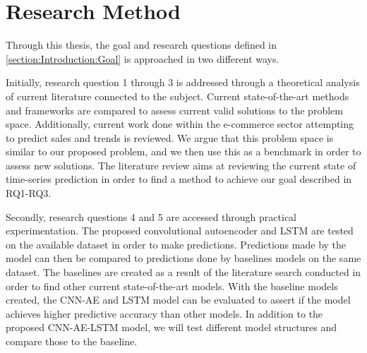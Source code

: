 \section{Research Method}
\label{section:Introduction:research-method}

Through this thesis, the goal and research questions defined in \autoref{section:Introduction:Goal} is approached in two different ways.

Initially, research question 1 through 3 is addressed through a theoretical analysis of current literature connected to the subject.
Current state-of-the-art methods and frameworks are compared to assess current valid solutions to the problem space.
Additionally, current work done within the e-commerce sector attempting to predict sales and trends is reviewed.
We argue that this problem space is similar to our proposed problem, and we then use this as a benchmark in order to assess new solutions.
The literature review aims at reviewing the current state of time-series prediction in order to find a method to achieve our goal described in RQ1-RQ3.

Secondly, research questions 4 and 5 are accessed through practical experimentation.
The proposed convolutional autoencoder and LSTM are tested on the available dataset in order to make predictions.
Predictions made by the model can then be compared to predictions done by baselines models on the same dataset.
The baselines are created as a result of the literature search conducted in order to find other current state-of-the-art models.
With the baseline models created, the CNN-AE and LSTM model can be evaluated to assert if the model achieves higher predictive accuracy than other models.
In addition to the proposed CNN-AE-LSTM model, we will test different model structures and compare those to the baseline.



\iffalse
  This thesis approaches the goal and research questions through theoretical analysis
  of the problem space.
  Primarily the focus of this thesis is to conduct a review and analysis of current literature.
  Reviewing the current state-of-the-art methods for predictive analysis of time-series,
  as well as new experimental methods and frameworks.
  Additionally, we review the current work done within the E-commerce sector attempting to predict sales and trends.
  We argue that this problem space is similar to our proposed problem, and we thus use this as a benchmark in order to assess new solutions.
  The literature review aims at reviewing the current state of time-series prediction,
  in order to best find a method to achieve our goal described above.
\fi



